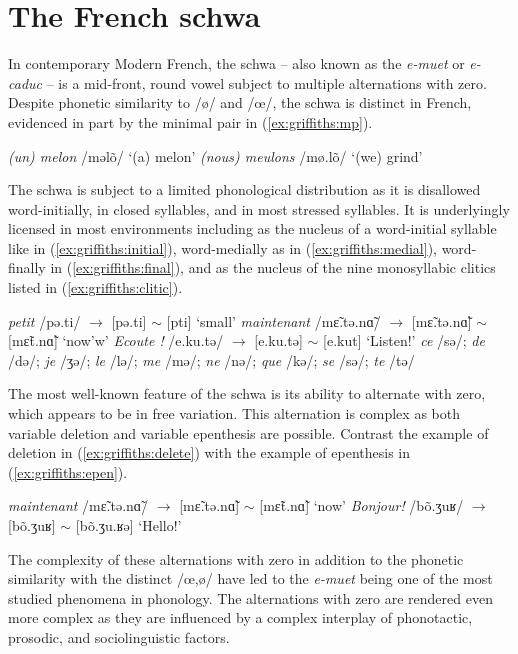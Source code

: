 \documentclass[output=paper,colorlinks,citecolor=brown,
]{langscibook}
\begin{document}
\section{The French schwa}
\label{sec:griffiths:schwa}
In contemporary Modern French, the schwa -- also known as the \textit{e-muet} or \textit{e-caduc} -- is a mid-front, round vowel subject to multiple alternations with zero. Despite phonetic similarity to /ø/ and /œ/, the schwa is distinct in French, evidenced in part by the minimal pair in (\ref{ex:griffiths:mp}).
\begin{exe}
\ex\label{ex:griffiths:mp} \begin{xlist}
\ex\label{ex:griffiths:melon} \textit{(un) melon} /məlõ/ `(a) melon'
\ex\label{ex:griffiths:meulons} \textit{(nous) meulons} /mø.lõ/ `(we) grind'
\end{xlist}
\end{exe}
The schwa is subject to a limited phonological distribution as it is disallowed word-initially, in closed syllables, and in most stressed syllables. It is underlyingly licensed in most environments including as the nucleus of a word-initial syllable like in (\ref{ex:griffiths:initial}), word-medially as in (\ref{ex:griffiths:medial}), word-finally in (\ref{ex:griffiths:final}), and as the nucleus of the nine monosyllabic clitics listed in (\ref{ex:griffiths:clitic}).
\begin{exe}
\ex\label{ex:griffiths:initial} \textit{petit} /pə.ti/ $\rightarrow$ [pə.ti] $\sim$ [pti] `small'
\ex\label{ex:griffiths:medial} \textit{maintenant} /mɛ̃.tə.nɑ̃/ $\rightarrow$ [mɛ̃.tə.nɑ̃] $\sim$ [mɛ̃t.nɑ̃] `now'w'
\ex\label{ex:griffiths:final} \textit{Ecoute !} /e.ku.tə/ $\rightarrow$ [e.ku.tə] $\sim$ [e.kut] `Listen!'
\ex\label{ex:griffiths:clitic} \textit{ce} /sə/; \textit{de} /də/; \textit{je} /ʒə/; \textit{le} /lə/; \textit{me} /mə/; \textit{ne} /nə/; \textit{que} /kə/; \textit{se} /sə/; \textit{te} /tə/
\end{exe}
The most well-known feature of the schwa is its ability to alternate with zero, which appears to be in free variation. This alternation is complex as both variable deletion and variable epenthesis are possible. Contrast the example of deletion in (\ref{ex:griffiths:delete}) with the example of epenthesis in (\ref{ex:griffiths:epen}).
\begin{exe}
\ex\label{ex:griffiths:delete} \textit{maintenant} /mɛ̃.tə.nɑ̃/ $\rightarrow$ [mɛ̃.tə.nɑ̃] $\sim$ [mɛ̃t.nɑ̃] `now'
\ex\label{ex:griffiths:epen} \textit{Bonjour!} /bõ.ʒuʁ/ $\rightarrow$ [bõ.ʒuʁ] $\sim$ [bõ.ʒu.ʁə] `Hello!'
\end{exe}
The complexity of these alternations with zero in addition to the phonetic similarity with the distinct /œ,ø/ have led to the \textit{e-muet} being one of the most studied phenomena in phonology. The alternations with zero are rendered even more complex as they are influenced by a complex interplay of phonotactic, prosodic, and sociolinguistic factors. 
\end{document}
